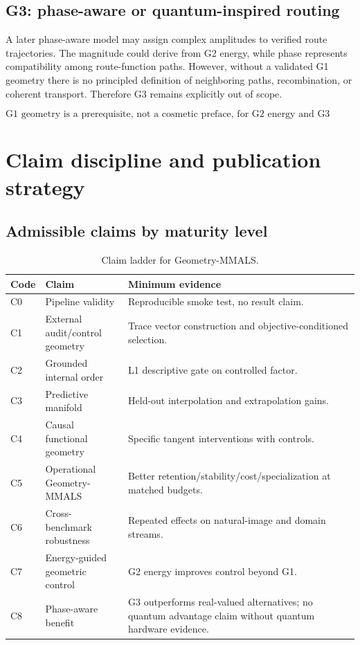 \documentclass[11pt,a4paper]{article}
\begin{document}
\subsection{G3: phase-aware or quantum-inspired routing}

A later phase-aware model may assign complex amplitudes to verified route trajectories. The magnitude could derive from G2 energy, while phase represents compatibility among route-function paths. However, without a validated G1 geometry there is no principled definition of neighboring paths, recombination, or coherent transport. Therefore G3 remains explicitly out of scope.

\begin{equation}
\boxed{\text{G1 geometry is a prerequisite, not a cosmetic preface, for G2 energy and G3 interference.}}
\end{equation}

\section{Claim discipline and publication strategy}

\subsection{Admissible claims by maturity level}

\begin{table}[H]
\centering
\caption{Claim ladder for Geometry-MMALS.}
\label{tab:claims}
\begin{tabularx}{\textwidth}{@{}p{1.2cm}p{4cm}Y@{}}
\toprule
\textbf{Code} & \textbf{Claim} & \textbf{Minimum evidence} \\
\midrule
C0 & Pipeline validity & Reproducible smoke test, no result claim. \\
C1 & External audit/control geometry & Trace vector construction and objective-conditioned selection. \\
C2 & Grounded internal order & L1 descriptive gate on controlled factor. \\
C3 & Predictive manifold & Held-out interpolation and extrapolation gains. \\
C4 & Causal functional geometry & Specific tangent interventions with controls. \\
C5 & Operational Geometry-MMALS & Better retention/stability/cost/specialization at matched budgets. \\
C6 & Cross-benchmark robustness & Repeated effects on natural-image and domain streams. \\
C7 & Energy-guided geometric control & G2 energy improves control beyond G1. \\
C8 & Phase-aware benefit & G3 outperforms real-valued alternatives; no quantum advantage claim without quantum hardware evidence. \\
\bottomrule
\end{tabularx}
\end{table}
\end{document}
